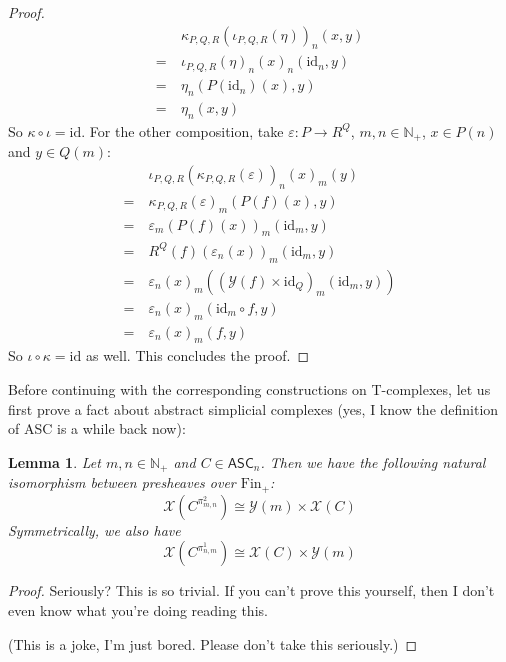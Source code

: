 \documentclass{article}
\newtheorem{lemma}{Lemma}[subsection]
\theoremstyle{remark}
\theoremstyle{definition}
\newcommand{\N}{\mathbb N}
\newcommand{\Fin}{\mathrm{Fin}}
\newcommand{\ASC}{\mathsf{ASC}}
\newcommand{\id}{\mathrm{id}}
\newcommand{\Y}{\mathcal Y}
\newcommand{\X}{\mathcal X}
\begin{document}
\begin{proof}
		\begin{align*}
			&\kappa_{P,Q,R}(\iota_{P,Q,R}(\eta))_n(x, y)\\
			=\ &\iota_{P,Q,R}(\eta)_n(x)_n(\id_n, y)\\
			=\ &\eta_n(P(\id_n)(x),y)\\
			=\ &\eta_n(x,y)
		\end{align*}
		So $\kappa\circ\iota=\id$. For the other composition, take $\varepsilon:P\to R^Q$, $m,n\in\N_+$, $x\in P(n)$ and $y\in Q(m)$:
		\begin{align*}
			&\iota_{P,Q,R}(\kappa_{P,Q,R}(\varepsilon))_n(x)_m(y)\\
			=\ &\kappa_{P,Q,R}(\varepsilon)_m(P(f)(x), y)\\
			=\ &\varepsilon_m(P(f)(x))_m(\id_m,y)\\
			=\ &R^Q(f)(\varepsilon_n(x))_m(\id_m,y)\\
			=\ &\varepsilon_n(x)_m((\Y(f)\times\id_Q)_m(\id_m,y))\\
			=\ &\varepsilon_n(x)_m(\id_m\circ f,y)\\
			=\ &\varepsilon_n(x)_m(f,y)
		\end{align*}
		So $\iota\circ\kappa=\id$ as well. This concludes the proof.
	\end{proof}
	Before continuing with the corresponding constructions on T-complexes, let us first prove a fact about abstract simplicial complexes (yes, I know the definition of ASC is a while back now):
	\begin{lemma}
		Let $m,n\in\N_+$ and $C\in\ASC_n$. Then we have the following natural isomorphism between presheaves over $\Fin_+$:
		\[\X(C^{\pi^2_{m,n}})\cong \Y(m)\times\X(C)\]
		Symmetrically, we also have
		\[\X(C^{\pi^1_{n,m}})\cong \X(C)\times\Y(m)\]
	\end{lemma}
	\begin{proof}
		Seriously? This is so trivial. If you can't prove this yourself, then I don't even know what you're doing reading this.
		
		(This is a joke, I'm just bored. Please don't take this seriously.)
	\end{proof}
\end{document}
